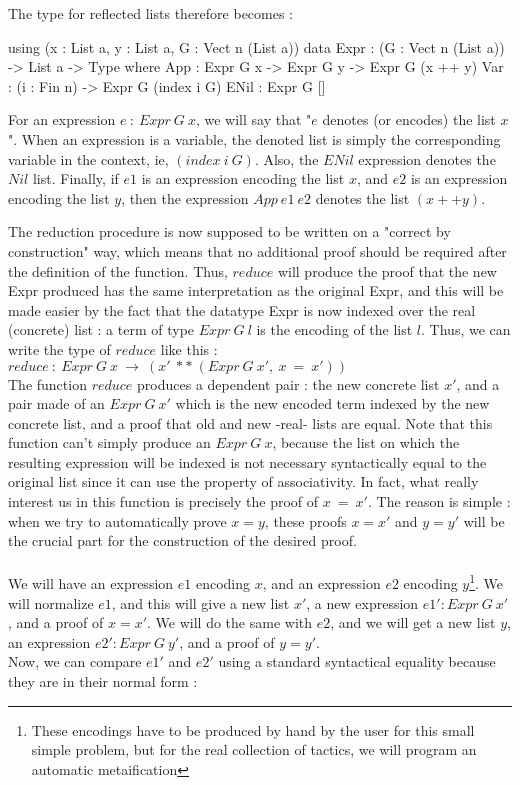 \documentclass{sigplanconf}
\begin{document}
The type for reflected lists therefore becomes :
\begin{code}[caption=Second version of reflected lists with embedded denotation, captionpos=b, label=lst1:haskell2]
using (x : List a, y : List a, 
       G : Vect n (List a))
  data Expr : (G : Vect n (List a)) -> 
              List a -> Type where
       App  : Expr G x -> Expr G y -> 
              Expr G (x ++ y)
       Var  : (i : Fin n) -> 
              Expr G (index i G)
       ENil : Expr G []
\end{code}
For an expression $e\ :\ Expr\ G\ x$, we will say that "$e$ denotes (or encodes) the list $x$".
When an expression is a variable, the denoted list is simply the corresponding variable in the context, ie, $(index\ i\ G)$.
Also, the $ENil$ expression denotes the $Nil$ list.
Finally, if $e1$ is an expression encoding the list $x$, and $e2$ is an expression encoding the list $y$, then the expression $App\ e1\ e2$ denotes the list $(x ++ y)$.

The reduction procedure is now supposed to be written on a "correct by construction" way, which means that no additional proof should be required after the definition of the function. Thus, $reduce$ will produce the proof that the new Expr produced has the same interpretation as the original Expr, and this will be made easier by the fact that the datatype Expr is now indexed over the real (concrete) list : a term of type $Expr\ G\ l$ is the encoding of the list $l$.
Thus, we can write the type of $reduce$ like this : \\
$reduce\ :\ Expr\ G\ x\ \rightarrow\ (x'\ **\ (Expr\ G\ x',\ x\ =\ x'))$ \\
The function $reduce$ produces a dependent pair : the new concrete list $x'$, and a pair made of an $Expr\ G\ x'$ which is the new encoded term indexed by the new concrete list, and a proof that old and new -real- lists are equal.
Note that this function can't simply produce an $Expr\ G\ x$, because the list on which the resulting expression will be indexed is not necessary syntactically equal to the original list since it can use the property of associativity. 
In fact, what really interest us in this function is precisely the proof of $x\ =\ x'$.
The reason is simple : when we try to automatically prove $x=y$, these proofs $x=x'$ and $y=y'$ will be the crucial part for the construction of the desired proof. \\
\\
We will have an expression $e1$ encoding $x$, and an expression $e2$ encoding $y$\footnote{These encodings have to be produced by hand by the user for this small simple problem, but for the real collection of tactics, we will program an automatic metaification}.
We will normalize $e1$, and this will give a new list $x'$, a new expression $e1':Expr\ G\ x'$, and a proof of $x=x'$. We will do the same with $e2$, and we will get a new list $y$, an expression $e2':Expr\ G\ y'$, and a proof of $y=y'$. \\
Now, we can compare $e1'$ and $e2'$ using a standard syntactical equality because they are in their normal form :
\end{document}
